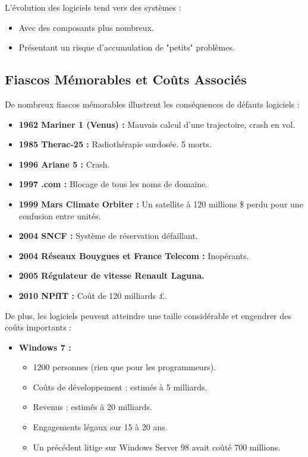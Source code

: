 \documentclass{article}
\begin{document}
L'évolution des logiciels tend vers des systèmes :

\begin{itemize}
    \item Avec des composants plus nombreux.
    \item Présentant un risque d'accumulation de "petits" problèmes.
\end{itemize}

\subsection{Fiascos Mémorables et Coûts Associés}

De nombreux fiascos mémorables illustrent les conséquences de défauts logiciels :

\begin{itemize}
    \item \textbf{1962 Mariner 1 (Venus) :} Mauvais calcul d'une trajectoire, crash en vol.
    \item \textbf{1985 Therac-25 :} Radiothérapie surdosée. 5 morts.
    \item \textbf{1996 Ariane 5 :} Crash.
    \item \textbf{1997 .com :} Blocage de tous les noms de domaine.
    \item \textbf{1999 Mars Climate Orbiter :} Un satellite à 120 millions \$ perdu pour une confusion entre unités.
    \item \textbf{2004 SNCF :} Système de réservation défaillant.
    \item \textbf{2004 Réseaux Bouygues et France Telecom :} Inopérants.
    \item \textbf{2005 Régulateur de vitesse Renault Laguna.}
    \item \textbf{2010 NPfIT :} Coût de 120 milliards £.
\end{itemize}

De plus, les logiciels peuvent atteindre une taille considérable et engendrer des coûts importants :

\begin{itemize}
    \item \textbf{Windows 7 :}
    \begin{itemize}
        \item 1200 personnes (rien que pour les programmeurs).
        \item Coûts de développement : estimés à 5 milliards.
        \item Revenus : estimés à 20 milliards.
        \item Engagements légaux sur 15 à 20 ans.
        \item Un précédent litige sur Windows Server 98 avait coûté 700 millions.
    \end{itemize}
\end{itemize}
\end{document}

